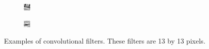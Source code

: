\documentclass[10pt,twocolumn]{article}
\begin{document}
\begin{figure}
	\centering
	\begin{subfigure}{.23\textwidth}
		\includegraphics[width=\textwidth]{figure/filter1}
	\end{subfigure}
	\begin{subfigure}{.23\textwidth}
		\includegraphics[width=\textwidth]{figure/filter2}
	\end{subfigure}
	\caption{Examples of convolutional filters. These filters are 13 by 13 pixels.}
	\label{fig:filter}
\end{figure}
\end{document}
